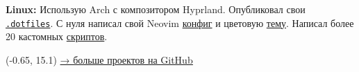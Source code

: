 \documentclass[margin,line]{resume}
\begin{document}
\begin{resume}
    \vspace{-6mm}

    \textbf{Linux:} Использую Arch с композитором Hyprland. Опубликовал
    свои
    \href{https:/github.com/alchemmist/.dotfiles}{\texttt{.dotfiles}}.
    С нуля написал свой Neovim
    \href{https://github.com/alchemmist/.dotfiles/tree/main/nvim}{конфиг}
    и цветовую
    \href{https://github.com/alchemmist/nothing.nvim}{тему}.
    Написал более 20 кастомных
    \href{https://github.com/alchemmist/.dotfiles/tree/main/scripts}{скриптов}.

  \end{resume}

  \begin{minipage}[H]{9.18\textwidth}
    \begin{textblock}{7}(-0.65, 15.1)
      \begingroup
      \hspace{35mm}
      \hypersetup{urlcolor=gray!90}
      \large
      \href{https://github.com/alchemmist}{→ больше проектов на
      \underline{GitHub}}
      \endgroup
    \end{textblock}

  \end{minipage}

  \clearpage

  
\end{document}
